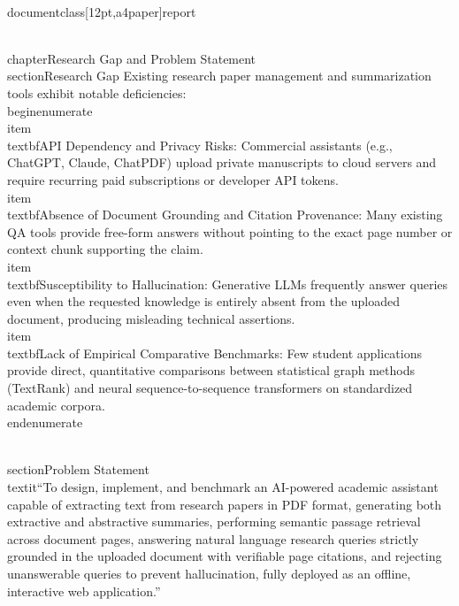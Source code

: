 \\documentclass[12pt,a4paper]{report}
\begin{document}
\\chapter{Research Gap and Problem Statement}
\\section{Research Gap}
Existing research paper management and summarization tools exhibit notable deficiencies:
\\begin{enumerate}
    \\item \\textbf{API Dependency and Privacy Risks:} Commercial assistants (e.g., ChatGPT, Claude, ChatPDF) upload private manuscripts to cloud servers and require recurring paid subscriptions or developer API tokens.
    \\item \\textbf{Absence of Document Grounding and Citation Provenance:} Many existing QA tools provide free-form answers without pointing to the exact page number or context chunk supporting the claim.
    \\item \\textbf{Susceptibility to Hallucination:} Generative LLMs frequently answer queries even when the requested knowledge is entirely absent from the uploaded document, producing misleading technical assertions.
    \\item \\textbf{Lack of Empirical Comparative Benchmarks:} Few student applications provide direct, quantitative comparisons between statistical graph methods (TextRank) and neural sequence-to-sequence transformers on standardized academic corpora.
\\end{enumerate}

\\section{Problem Statement}
\\textit{``To design, implement, and benchmark an AI-powered academic assistant capable of extracting text from research papers in PDF format, generating both extractive and abstractive summaries, performing semantic passage retrieval across document pages, answering natural language research queries strictly grounded in the uploaded document with verifiable page citations, and rejecting unanswerable queries to prevent hallucination, fully deployed as an offline, interactive web application.''}
\end{document}
